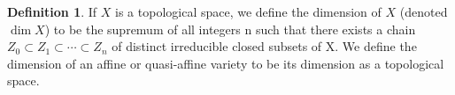 \documentclass[11pt]{book}
\theoremstyle{definition}
\newtheorem{definition}[theorem]{Definition}
\numberwithin{equation}{section}
\begin{document}
\begin{defbox}
    \begin{definition}
        \label{def:dimension_topological_space}
        If \(X\) is a topological space, we define the dimension of \(X\) (denoted
        \(\dim  X\)) to be the supremum of all integers n such that there exists a chain \(Z_0 \subset Z_1 \subset \cdots \subset Z_n\) of distinct irreducible closed subsets of X. We define the dimension of an affine or quasi-affine variety to be its dimension as a topological space. 
    \end{definition}
\end{defbox}

% 

\printbibliography
\end{document}
